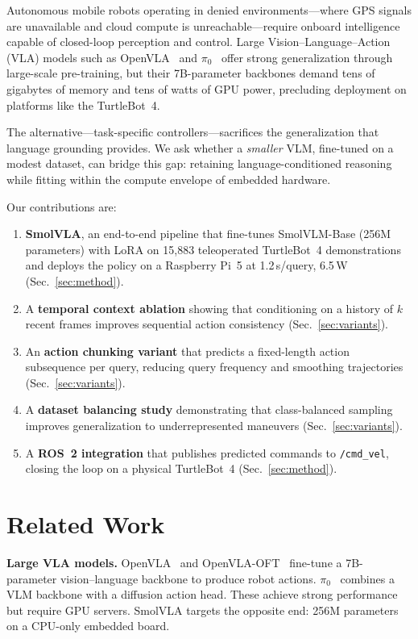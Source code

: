 \documentclass[conference]{IEEEtran}
\begin{document}
Autonomous mobile robots operating in denied environments---where GPS signals are unavailable
and cloud compute is unreachable---require onboard intelligence capable of closed-loop perception
and control. Large Vision--Language--Action (VLA) models such as OpenVLA~\cite{openvla} and
$\pi_0$~\cite{pi0} offer strong generalization through large-scale pre-training, but their
7B-parameter backbones demand tens of gigabytes of memory and tens of watts of GPU power,
precluding deployment on platforms like the TurtleBot~4.

The alternative---task-specific controllers---sacrifices the generalization that language
grounding provides. We ask whether a \emph{smaller} VLM, fine-tuned on a modest dataset, can
bridge this gap: retaining language-conditioned reasoning while fitting within the compute
envelope of embedded hardware.

Our contributions are:
\begin{enumerate}
    \item \textbf{SmolVLA}, an end-to-end pipeline that fine-tunes SmolVLM-Base (256M
          parameters) with LoRA on 15,883 teleoperated TurtleBot~4 demonstrations and deploys
          the policy on a Raspberry Pi~5 at 1.2\,s/query, 6.5\,W (Sec.~\ref{sec:method}).
    \item A \textbf{temporal context ablation} showing that conditioning on a history of $k$
          recent frames improves sequential action consistency (Sec.~\ref{sec:variants}).
    \item An \textbf{action chunking variant} that predicts a fixed-length action subsequence
          per query, reducing query frequency and smoothing trajectories
          (Sec.~\ref{sec:variants}).
    \item A \textbf{dataset balancing study} demonstrating that class-balanced sampling
          improves generalization to underrepresented maneuvers
          (Sec.~\ref{sec:variants}).
    \item A \textbf{ROS~2 integration} that publishes predicted commands to
          \texttt{/cmd\_vel}, closing the loop on a physical TurtleBot~4
          (Sec.~\ref{sec:method}).
\end{enumerate}

\section{Related Work}
\label{sec:related}

\textbf{Large VLA models.}
OpenVLA~\cite{openvla} and OpenVLA-OFT~\cite{openvlaoft} fine-tune a 7B-parameter
vision--language backbone to produce robot actions. $\pi_0$~\cite{pi0} combines a VLM backbone
with a diffusion action head. These achieve strong performance but require GPU servers. SmolVLA
targets the opposite end: 256M parameters on a CPU-only embedded board.
\end{document}
